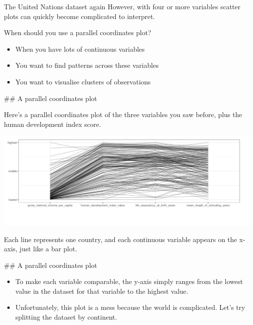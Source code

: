 \documentclass[
  ignorenonframetext,
]{beamer}
\begin{document}
\begin{frame}{The United Nations dataset again}
\label{the-united-nations-dataset-again-1}
However, with four or more variables scatter plots can quickly become
complicated to interpret.
\end{frame}

\begin{frame}{When should you use a parallel coordinates plot?}
\label{when-should-you-use-a-parallel-coordinates-plot}
\begin{itemize}
\item
  When you have lots of continuous variables
\item
  You want to find patterns across these variables
\item
  You want to visualise clusters of observations
\end{itemize}

\#\# A parallel coordinates plot

Here's a parallel coordinates plot of the three variables you saw
before, plus the human development index score.

\includegraphics{../images/im98.png}

Each line represents one country, and each continuous variable appears
on the x-axis, just like a bar plot.

\#\# A parallel coordinates plot

\begin{itemize}
\item
  To make each variable comparable, the y-axis simply ranges from the
  lowest value in the dataset for that variable to the highest value.
\item
  Unfortunately, this plot is a mess because the world is complicated.
  Let's try splitting the dataset by continent.
\end{itemize}
\end{frame}
\end{document}
